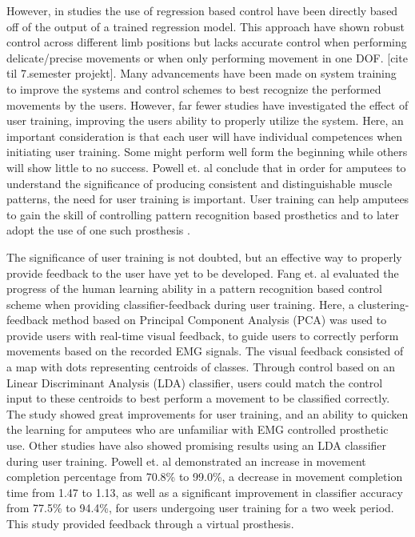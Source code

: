 However, in studies the use of regression based control have been directly based off of the output of a trained regression model. This approach have shown robust control across different limb positions but lacks accurate control when performing delicate/precise movements or when only performing movement in one DOF. [cite til 7.semester projekt]. Many advancements have been made on system training to improve the systems and control schemes to best recognize the performed movements by the users. However, far fewer studies have investigated the effect of user training, improving the users ability to properly utilize the system. Here, an important consideration is that each user will have individual competences when initiating user training. Some might perform well form the beginning while others will show little to no success. \cite{Powell2013} Powell et. al \cite{Powell2013} conclude that in order for amputees to understand the significance of producing consistent and distinguishable muscle patterns, the need for user training is important. User training can help amputees to gain the skill of controlling pattern recognition based prosthetics and to later adopt the use of one such prosthesis \cite{Powell2013}.

The significance of user training is not doubted, but an effective way to properly provide feedback to the user have yet to be developed. 
Fang et. al \cite{Fang2017} evaluated the progress of the human learning ability in a pattern recognition based control scheme when providing classifier-feedback during user training. Here, a clustering-feedback method based on Principal Component Analysis (PCA) was used to provide users with real-time visual feedback, to guide users to correctly perform movements based on the recorded EMG signals. The visual feedback consisted of a map with dots representing centroids of classes. Through control based on an Linear Discriminant Analysis (LDA) classifier, users could match the control input to these centroids to best perform a movement to be classified correctly. The study showed great improvements for user training, and an ability to quicken the learning for amputees who are unfamiliar with EMG controlled prosthetic use. \cite{Fang2017}
Other studies have also showed promising results using an LDA classifier during user training. Powell et. al \cite{Powell2014} demonstrated an increase in movement completion percentage from 70.8\% to 99.0\%, a decrease in movement completion time from 1.47 to 1.13, as well as a significant improvement in classifier accuracy from 77.5\% to 94.4\%, for users undergoing user training for a two week period. This study provided feedback through a virtual prosthesis.


